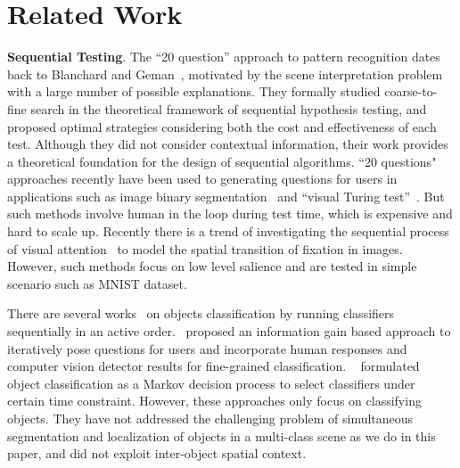 \section{Related Work}
\label{sec:relatedwork}

{\bf{Sequential Testing}}. 
The ``20 question'' approach to pattern recognition dates back to Blanchard and Geman~\cite{blanchard2005hierarchical}, motivated by the scene interpretation problem with a large number of possible explanations. They formally studied coarse-to-fine search in the theoretical framework of sequential hypothesis testing, and proposed optimal strategies considering both the cost and effectiveness of each test. Although they did not consider contextual information, their work provides a theoretical foundation for the design of sequential algorithms. ``20 questions" approaches recently have been used to generating questions for users in applications such as image binary segmentation~\cite{rupprecht2015image} and ``visual Turing test''~\cite{geman2015visual}. But such methods involve human in the loop during test time, which is expensive and hard to scale up.  Recently there is a trend of investigating the sequential process of visual attention~\cite{paletta2005q, ranzato2014learning, larochelle2010learning} to model the spatial transition of fixation in images. However, such methods focus on low level salience and are tested in simple scenario such as MNIST dataset. 

There are several works~\cite{gao2011active} on objects classification by running classifiers sequentially in an active order.~\cite{branson2010visual} proposed an information gain based approach to iteratively pose questions for users and incorporate human responses and computer vision detector results for fine-grained classification.
~\cite{sergey2012timely} formulated object classification as a Markov decision process to select classifiers under certain time constraint. However, these approaches only focus on classifying objects. They have not addressed the challenging problem of simultaneous segmentation and localization of objects in a multi-class scene as we do in this paper, and did not exploit inter-object spatial context.



